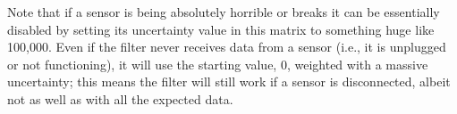 Note that if a sensor is being absolutely horrible or breaks it can be essentially disabled by setting its uncertainty value in this matrix to something huge like 100,000. Even if the filter never receives data from a sensor (i.e., it is unplugged or not functioning), it will use the starting value, 0, weighted with a massive uncertainty; this means the filter will still work if a sensor is disconnected, albeit not as well as with all the expected data.